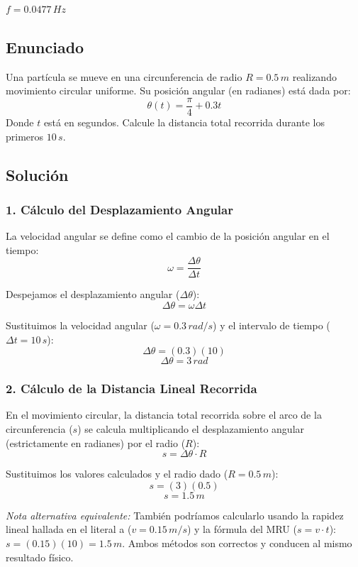 \documentclass[12pt, a4paper]{article}
\begin{document}
\begin{tcolorbox}[colback=green!5!white, colframe=green!50!black, title=Respuesta Final]
\centering \Large $f = 0.0477 \, \si{Hz}$
\end{tcolorbox}

\newpage

\subsection*{Enunciado}
Una partícula se mueve en una circunferencia de radio $R = 0.5 \, \si{m}$ realizando movimiento circular uniforme. Su posición angular (en radianes) está dada por:
$$ \theta(t) = \frac{\pi}{4} + 0.3 t $$
Donde $t$ está en segundos. Calcule la distancia total recorrida durante los primeros $10 \, \si{s}$.

\subsection*{Solución}

\subsubsection*{1. Cálculo del Desplazamiento Angular}
La velocidad angular se define como el cambio de la posición angular en el tiempo:
$$ \omega = \frac{\Delta \theta}{\Delta t} $$

Despejamos el desplazamiento angular ($\Delta \theta$):
$$ \Delta \theta = \omega \Delta t $$

Sustituimos la velocidad angular ($\omega = 0.3 \, \si{rad/s}$) y el intervalo de tiempo ($\Delta t = 10 \, \si{s}$):
$$ \Delta \theta = (0.3)(10) $$
$$ \Delta \theta = 3 \, \si{rad} $$

\subsubsection*{2. Cálculo de la Distancia Lineal Recorrida}
En el movimiento circular, la distancia total recorrida sobre el arco de la circunferencia ($s$) se calcula multiplicando el desplazamiento angular (estrictamente en radianes) por el radio ($R$):
$$ s = \Delta \theta \cdot R $$

Sustituimos los valores calculados y el radio dado ($R = 0.5 \, \si{m}$):
$$ s = (3)(0.5) $$
$$ s = 1.5 \, \si{m} $$

\textit{Nota alternativa equivalente:} También podríamos calcularlo usando la rapidez lineal hallada en el literal a ($v = 0.15 \, \si{m/s}$) y la fórmula del MRU ($s = v \cdot t$): $s = (0.15)(10) = 1.5 \, \si{m}$. Ambos métodos son correctos y conducen al mismo resultado físico.
\end{document}
